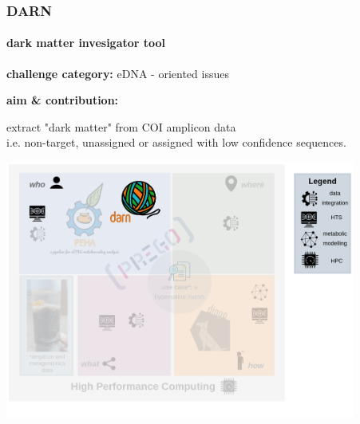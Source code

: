 \documentclass{beamer}
\begin{document}
   \begin{darkframes}
      \begin{frame}
         \frametitle{ \textbf{DARN}}
         \framesubtitle{dark matter invesigator tool}


         \small 

         \textbf{challenge category:} eDNA - oriented issues

         \bigskip

         \textbf{aim \& contribution:}

         extract "dark matter"
         from COI amplicon data  \\
         i.e. non-target, unassigned or assigned with low confidence sequences.
      \end{frame}
   \end{darkframes}

   \begin{frame}
      \includegraphics[width=115mm]{resources/phd_graphical_abstract-darn.png}
   \end{frame}
\end{document}
